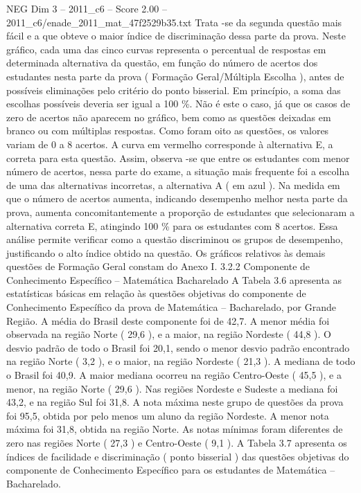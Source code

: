 \begin{textsample}{NEG Dim 3 – 2011\_c6 – Score 2.00 – 2011\_c6/enade\_2011\_mat\_47f2529b35.txt}
Trata -se da segunda questão mais fácil e a que obteve o maior índice de discriminação dessa parte da prova.
Neste gráfico, cada uma das cinco curvas representa o percentual de respostas em determinada alternativa da questão, em função do número de acertos dos estudantes nesta parte da prova ( Formação Geral/Múltipla Escolha ), antes de possíveis eliminações pelo critério do ponto bisserial.
Em princípio, a soma das escolhas possíveis deveria ser igual a 100 \%.
Não é este o caso, já que os casos de zero de acertos não aparecem no gráfico, bem como as questões deixadas em branco ou com múltiplas respostas.
Como foram oito as questões, os valores variam de 0 a 8 acertos.
A curva em vermelho corresponde à alternativa E, a correta para esta questão.
Assim, observa -se que entre os estudantes com menor número de acertos, nessa parte do exame, a situação mais frequente foi a escolha de uma das alternativas incorretas, a alternativa A ( em azul ).
Na medida em que o número de acertos aumenta, indicando desempenho melhor nesta parte da prova, aumenta concomitantemente a proporção de estudantes que selecionaram a alternativa correta E, atingindo 100 \% para os estudantes com 8 acertos.
Essa análise permite verificar como a questão discriminou os grupos de desempenho, justificando o alto índice obtido na questão.
Os gráficos relativos às demais questões de Formação Geral constam do Anexo I. 3.2.2 Componente de Conhecimento Específico – Matemática Bacharelado A Tabela 3.6 apresenta as estatísticas básicas em relação às questões objetivas do componente de Conhecimento Específico da prova de Matemática – Bacharelado, por Grande Região.
A média do Brasil deste componente foi de 42,7.
A menor média foi observada na região Norte ( 29,6 ), e a maior, na região Nordeste ( 44,8 ).
O desvio padrão de todo o Brasil foi 20,1, sendo o menor desvio padrão encontrado na região Norte ( 3,2 ), e o maior, na região Nordeste ( 21,3 ).
A mediana de todo o Brasil foi 40,9.
A maior mediana ocorreu na região Centro-Oeste ( 45,5 ), e a menor, na região Norte ( 29,6 ).
Nas regiões Nordeste e Sudeste a mediana foi 43,2, e na região Sul foi 31,8.
A nota máxima neste grupo de questões da prova foi 95,5, obtida por pelo menos um aluno da região Nordeste.
A menor nota máxima foi 31,8, obtida na região Norte.
As notas mínimas foram diferentes de zero nas regiões Norte ( 27,3 ) e Centro-Oeste ( 9,1 ).
A Tabela 3.7 apresenta os índices de facilidade e discriminação ( ponto bisserial ) das questões objetivas do componente de Conhecimento Específico para os estudantes de Matemática – Bacharelado.

\end{textsample}
